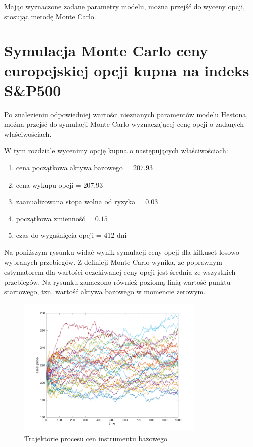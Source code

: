 \documentclass{pracamgr}
\begin{document}
Mając wyznaczone zadane parametry modelu, można przejść do wyceny opcji, stosując metodę Monte Carlo.


\section{Symulacja Monte Carlo ceny europejskiej opcji kupna na indeks S\&P500}

Po znalezieniu odpowiedniej wartości nieznanych paramentów modelu Hestona, można 
przejść do symulacji Monte Carlo wyznaczającej cenę opcji o zadanych właściwościach.

W tym rozdziale wycenimy opcję kupna o następujących właściwościach:
\begin{enumerate}
  \item cena początkowa aktywa bazowego = $207.93$
  \item cena wykupu opcji = $207.93$ 
  \item zaanualizowana stopa wolna od ryzyka = $0.03$
  \item początkowa zmienność =  $0.15$
  \item czas do wygaśnięcia opcji = 412 dni
\end{enumerate}
 
Na poniższym rysunku widać wynik symulacji ceny opcji dla kilkuset losowo wybranych przebiegów.
Z definicji Monte Carlo wynika, ze poprawnym estymatorem dla wartości oczekiwanej ceny
opcji jest średnia ze wszystkich przebiegów.
Na rysunku zanaczono również poziomą linią wartość punktu startowego, tzn. wartość 
aktywa bazowego w momencie zerowym.

\begin{figure}
\centering
  \includegraphics[width=0.80\textwidth]{../chartHeston.png}
  \caption{Trajektorie procesu cen instrumentu bazowego}
  \label{fig:hestonAssetPaths}
\end{figure}
\end{document}
